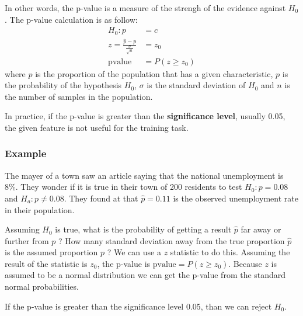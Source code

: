 \documentclass[12pt]{report}
\begin{document}
                In other words, the p-value is a measure of the strengh of the evidence against $H_0$. The p-value calculation is as follow:
                \begin{align}
                    H_0 : p &= c\\
                    z = \frac{\hat{p} - p}{\frac{\sigma}{\sqrt{n}}} &= z_0 \\
                    \text{pvalue} &= P(z \geq z_0)
                \end{align}
                where $\hat{p}$ is the proportion of the population that has a given characteristic, $p$ is the probability of the hypothesis $H_0$, $\sigma$ is the standard deviation of $H_0$ and $n$ is the number of samples in the population.
            
                In practice, if the p-value is greater than the \textbf{significance level}, usually 0.05, the given feature is not useful for the training task.
           \subsubsection{Example}
                The mayer of a town saw an article saying that the national unemployment is 8\%. They wonder if it is true in their town of 200 residents to test $H_0 : p = 0.08$ and $H_a : p \neq 0.08$. They found at that $\hat{p} = 0.11$ is the observed unemployment rate in their population.
                
                Assuming $H_0$ is true, what is the probability of getting a result $\hat{p}$ far away or further from $p$ ? How many standard deviation away from the true proportion $\hat{p}$ is the assumed proportion $p$ ? We can use a $z$ statistic to do this. Assuming the result of the statistic is $z_0$, the p-value is $\text{pvalue} = P(z \geq z_0)$. Because $z$ is assumed to be a  normal distribution we can get the p-value from the standard normal probabilities.
                
                If the p-value is greater than the significance level 0.05, than we can reject $H_0$.
        
\end{document}
